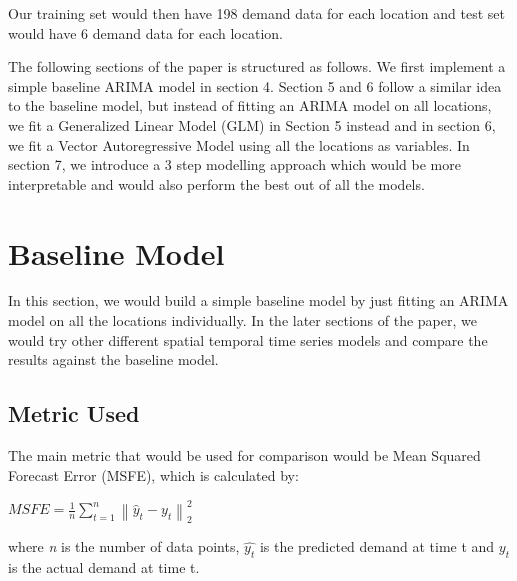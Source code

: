 \documentclass[12pt, letterpaper] {article}
\begin{document}
\noindent Our training set would then have 198 demand data for each location and test set would have 6 demand data for each location. 

\noindent The following sections of the paper is structured as follows. We first implement a simple baseline ARIMA model in section 4. Section 5 and 6 follow a similar idea to the baseline model, but instead of fitting an ARIMA model on all locations, we fit a Generalized Linear Model (GLM) in Section 5 instead and in section 6, we fit a Vector Autoregressive Model using all the locations as variables. In section 7, we introduce a 3 step modelling approach which would be more interpretable and would also perform the best out of all the models. 

\newpage

\section{Baseline Model}
In this section, we would build a simple baseline model by just fitting an ARIMA model on all the locations individually. In the later sections of the paper, we would try other different spatial temporal time series models and compare the results against the baseline model. 

\subsection{Metric Used}
The main metric that would be used for comparison would be Mean Squared Forecast Error (MSFE), which is calculated by:

\begin{center}
    $\displaystyle MSFE=\frac{1}{n}\sum_{t=1}^{n}\left \| \hat{y}_{t} - y_{t} \right \|_{2}^{2}$
\end{center}
where \textit{n} is the number of data points, $\hat{y_t}$ is the predicted demand at time t and ${y_t}$ is the actual demand at time t.
\end{document}
